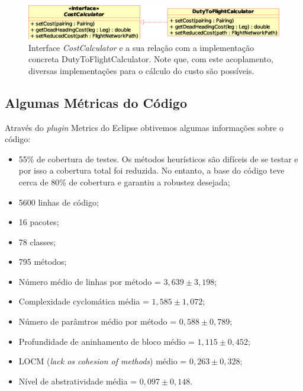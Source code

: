 \begin{figure}[htbp]
	\begin{center}
		\includegraphics[scale=0.65]{fig/cost_calculator.eps}
		\caption{Interface {\it CostCalculator} e a sua relação com a implementação concreta 																									DutyToFlightCalculator. Note que, com este acoplamento, diversas implementações para o cálculo
    do custo são possíveis.}
		\label{fig:cost_interface}
	\end{center}
\end{figure}



\subsection{Algumas Métricas do Código}
\label{sec:metricas}

Através do {\it plugin} Metrics do Eclipse obtivemos algumas informações sobre o código: 

\begin{itemize}
\item 55\% de cobertura de testes. Os métodos heurísticos são difíceis de se testar e por isso a
cobertura total foi reduzida. No entanto, a base do código teve cerca de 80\% de cobertura e 
garantiu a robustez desejada;
\item 5600 linhas de código; 
\item 16 pacotes; 
\item 78 classes; 
\item 795 métodos;
\item Número médio de linhas por método = $3,639 \pm 3,198$;
\item Complexidade cyclomática média = $1,585 \pm 1,072$;
\item Número de parâmtros médio por método = $0,588 \pm 0,789$;
\item Profundidade de aninhamento de bloco médio = $1,115 \pm 0,452$;
\item LOCM ({\it lack os cohesion of methods}) médio = $0,263 \pm 0,328$;
\item Nível de abstratividade média = $0,097 \pm 0,148$.
\end{itemize}

